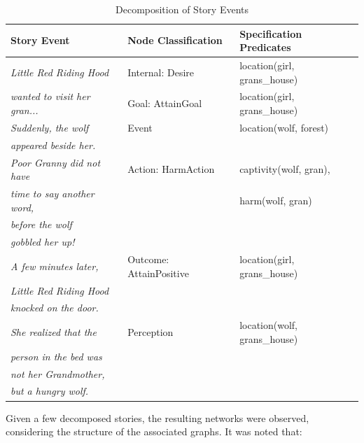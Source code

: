 \documentclass[12pt,a4paper,oneside]{report}
\begin{document}
\begin{table}[H]
\caption{Decomposition of Story Events}
\label{tab:fabulanode}
\bigskip
\begin{tabular}{| l | l | l |}

\hline
Story Event & Node Classification & Specification Predicates \\
\hline
\textit{Little Red Riding Hood} & Internal: Desire & location(girl, grans\_house) \\
\textit{wanted to visit her gran...} & Goal: AttainGoal & location(girl, grans\_house)\\
\hline
\textit{Suddenly, the wolf} & Event & location(wolf, forest) \\
\textit{appeared beside her.} & & \\
\hline
\textit{Poor Granny did not have} & Action: HarmAction & captivity(wolf, gran), \\
\textit{time to say another word,} & &  harm(wolf, gran) \\
\textit{before the wolf}  & & \\
\textit{gobbled her up!}  & & \\ 
\hline
\textit{A few minutes later,} & Outcome: AttainPositive &  location(girl, grans\_house)\\
\textit{Little Red Riding Hood} & & \\
\textit{knocked on the door.}  & & \\
\hline
\textit{She realized that the} & Perception &  location(wolf, grans\_house)\\
\textit{person in the bed was} & & \\
\textit{not her Grandmother,}  & & \\
\textit{but a hungry wolf.}  & & \\
\hline
\end{tabular}
\end{table}

\bigskip

Given a few decomposed stories, the resulting networks were observed, considering the structure of the associated graphs. It was noted that:
\end{document}
